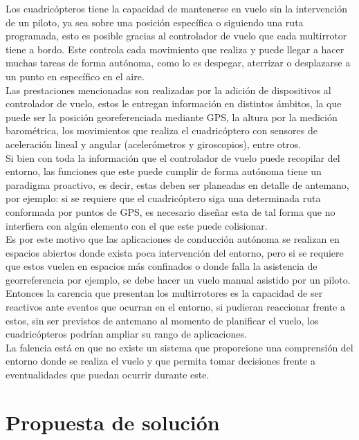 \documentclass{iccmemoria}
\begin{document}
Los cuadricópteros tiene la capacidad de mantenerse en vuelo sin la intervención de un piloto, ya sea sobre una posición específica o siguiendo una ruta programada, esto es posible gracias al controlador de vuelo que cada multirrotor tiene a bordo. Este controla cada movimiento que realiza y puede llegar a hacer muchas tareas de forma autónoma, como lo es despegar, aterrizar o desplazarse a un punto en específico en el aire.\\
 
Las prestaciones mencionadas son realizadas por la adición de dispositivos al controlador de vuelo, estos le entregan información en distintos ámbitos, la que puede ser la posición georeferenciada mediante GPS, la altura por la medición barométrica, los movimientos que realiza el cuadricóptero con sensores de aceleración lineal y angular (acelerómetros y giroscopios), entre otros.\\
 
Si bien con toda la información que el controlador de vuelo puede recopilar del entorno, las funciones que este puede cumplir de forma autónoma tiene un paradigma proactivo, es decir, estas deben ser planeadas en detalle de antemano, por ejemplo: si se requiere que el cuadricóptero siga una determinada ruta conformada por puntos de GPS, es necesario diseñar esta de tal forma que no interfiera con algún elemento con el que este puede colisionar.\\
 
Es por este motivo que las aplicaciones de conducción autónoma se realizan en espacios abiertos donde exista poca intervención del entorno, pero si se requiere que estos vuelen en espacios más confinados o donde falla la asistencia de georreferencia por ejemplo, se debe hacer un vuelo manual asistido por un piloto.\\
 
Entonces la carencia que presentan los multirrotores es la capacidad de ser reactivos ante eventos que ocurran en el entorno, si pudieran reaccionar frente a estos, sin ser previstos de antemano al momento de planificar el vuelo, los cuadricópteros podrían ampliar su rango de aplicaciones.\\
 
La falencia está en que no existe un sistema que proporcione una comprensión del entorno donde se realiza el vuelo y que permita tomar decisiones frente a eventualidades que puedan ocurrir durante este.\\

\section{Propuesta de solución}
\end{document}
